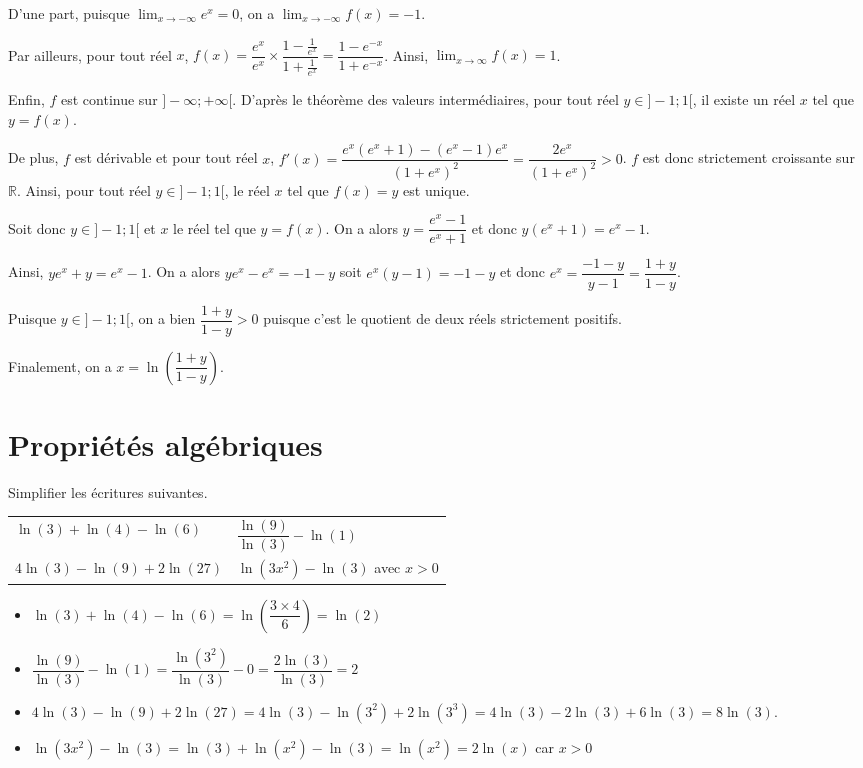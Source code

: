 \documentclass[11pt,fleqn, openany]{book} %
\begin{document}
\begin{solution}D'une part, puisque $\displaystyle\lim_{x \to - \infty}e^x=0$, on a $\displaystyle\lim_{x\to-\infty}f(x)=-1$. 

Par ailleurs, pour tout réel $x$, $f(x)=\dfrac{e^x}{e^x}\times \dfrac{1-\frac{1}{e^x}}{1+\frac{1}{e^x}}=\dfrac{1-e^{-x}}{1+e^{-x}}$. Ainsi, $\displaystyle\lim_{x\to \infty}f(x)=1$.

Enfin, $f$ est continue sur $]-\infty;+\infty[$. D'après le théorème des valeurs intermédiaires, pour tout réel $y\in]-1;1[$, il existe un réel $x$ tel que $y=f(x)$.

De plus, $f$ est dérivable et pour tout réel $x$, $f'(x)=\dfrac{e^x(e^x+1)-(e^x-1)e^x}{(1+e^x)^2}=\dfrac{2e^x}{(1+e^x)^2}>0$. $f$ est donc strictement croissante sur $\mathbb{R}$. Ainsi, pour tout réel $y\in ]-1;1[$, le réel $x$ tel que $f(x)=y$ est unique.

Soit donc $y\in]-1;1[$ et $x$ le réel tel que $y=f(x)$. On a alors $y=\dfrac{e^x-1}{e^x+1}$ et donc $y(e^x+1)=e^x-1$. 

Ainsi, $ye^x+y=e^x-1$. On a alors $ye^x-e^x=-1-y$ soit $e^x(y-1)=-1-y$ et donc $e^x=\dfrac{-1-y}{y-1}=\dfrac{1+y}{1-y}$. 

Puisque $y\in]-1;1[$, on a bien $\dfrac{1+y}{1-y}>0$ puisque c'est le quotient de deux réels strictement positifs. 

Finalement, on a $x=\ln\left(\dfrac{1+y}{1-y}\right)$.\end{solution}



\section*{Propriétés algébriques}

\begin{exercise}[topic=log02]Simplifier les écritures suivantes.

\begin{tabularx}{0.9\linewidth}{XX}
$\ln(3)+\ln(4)-\ln(6)$ & $\dfrac{\ln(9)}{\ln(3)}-\ln(1)$ \\
$4\ln(3)-\ln(9)+2\ln(27)$ & $\ln(3x^2)-\ln(3)$ avec $x>0$
\end{tabularx}
\end{exercise}

\begin{solution}\hspace{0pt}
\begin{itemize}
\item $\ln(3)+\ln(4)-\ln(6) = \ln\left( \dfrac{3 \times 4}{6}\right)=\ln(2)$
\item $\dfrac{\ln(9)}{\ln(3)}-\ln(1)=\dfrac{\ln(3^2)}{\ln(3)}-0=\dfrac{2\ln(3)}{\ln(3)}=2$
\vskip5pt
\item $4\ln(3)-\ln(9)+2\ln(27)=4\ln(3)-\ln(3^2)+2\ln(3^3)=4\ln(3)-2\ln(3)+6\ln(3)=8\ln(3)$.
\vskip5pt
\item $\ln(3x^2)-\ln(3)=\ln(3)+\ln(x^2)-\ln(3)=\ln(x^2)=2\ln(x)$ car $x>0$
\end{itemize}\end{solution}
\end{document}
